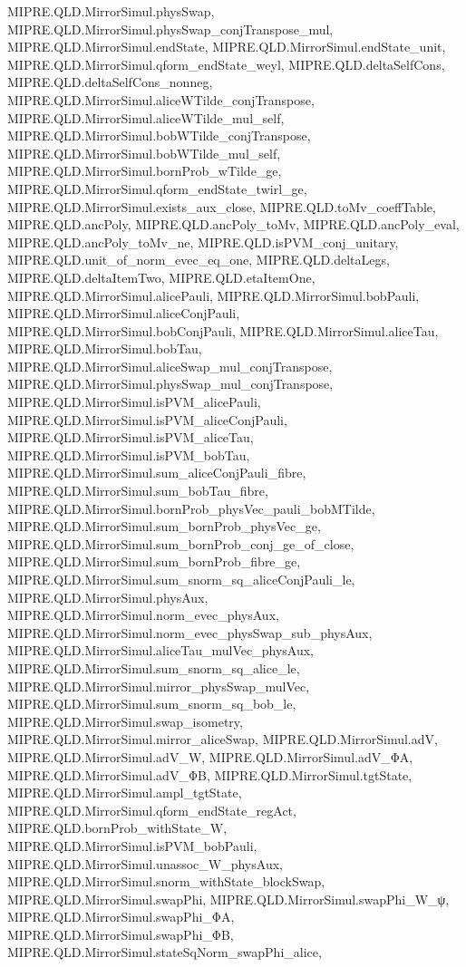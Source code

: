 \begin{lemma}
{  MIPRE.QLD.MirrorSimul.physSwap, MIPRE.QLD.MirrorSimul.physSwap_conjTranspose_mul,
  MIPRE.QLD.MirrorSimul.endState, MIPRE.QLD.MirrorSimul.endState_unit,
  MIPRE.QLD.MirrorSimul.qform_endState_weyl, MIPRE.QLD.deltaSelfCons,
  MIPRE.QLD.deltaSelfCons_nonneg, MIPRE.QLD.MirrorSimul.aliceWTilde_conjTranspose,
  MIPRE.QLD.MirrorSimul.aliceWTilde_mul_self, MIPRE.QLD.MirrorSimul.bobWTilde_conjTranspose,
  MIPRE.QLD.MirrorSimul.bobWTilde_mul_self, MIPRE.QLD.MirrorSimul.bornProb_wTilde_ge,
  MIPRE.QLD.MirrorSimul.qform_endState_twirl_ge, MIPRE.QLD.MirrorSimul.exists_aux_close,
  MIPRE.QLD.toMv_coeffTable, MIPRE.QLD.ancPoly, MIPRE.QLD.ancPoly_toMv, MIPRE.QLD.ancPoly_eval,
  MIPRE.QLD.ancPoly_toMv_ne, MIPRE.QLD.isPVM_conj_unitary, MIPRE.QLD.unit_of_norm_evec_eq_one,
  MIPRE.QLD.deltaLegs, MIPRE.QLD.deltaItemTwo, MIPRE.QLD.etaItemOne,
  MIPRE.QLD.MirrorSimul.alicePauli, MIPRE.QLD.MirrorSimul.bobPauli,
  MIPRE.QLD.MirrorSimul.aliceConjPauli, MIPRE.QLD.MirrorSimul.bobConjPauli,
  MIPRE.QLD.MirrorSimul.aliceTau, MIPRE.QLD.MirrorSimul.bobTau,
  MIPRE.QLD.MirrorSimul.aliceSwap_mul_conjTranspose,
  MIPRE.QLD.MirrorSimul.physSwap_mul_conjTranspose, MIPRE.QLD.MirrorSimul.isPVM_alicePauli,
  MIPRE.QLD.MirrorSimul.isPVM_aliceConjPauli, MIPRE.QLD.MirrorSimul.isPVM_aliceTau,
  MIPRE.QLD.MirrorSimul.isPVM_bobTau, MIPRE.QLD.MirrorSimul.sum_aliceConjPauli_fibre,
  MIPRE.QLD.MirrorSimul.sum_bobTau_fibre, MIPRE.QLD.MirrorSimul.bornProb_physVec_pauli_bobMTilde,
  MIPRE.QLD.MirrorSimul.sum_bornProb_physVec_ge,
  MIPRE.QLD.MirrorSimul.sum_bornProb_conj_ge_of_close, MIPRE.QLD.MirrorSimul.sum_bornProb_fibre_ge,
  MIPRE.QLD.MirrorSimul.sum_snorm_sq_aliceConjPauli_le, MIPRE.QLD.MirrorSimul.physAux,
  MIPRE.QLD.MirrorSimul.norm_evec_physAux, MIPRE.QLD.MirrorSimul.norm_evec_physSwap_sub_physAux,
  MIPRE.QLD.MirrorSimul.aliceTau_mulVec_physAux, MIPRE.QLD.MirrorSimul.sum_snorm_sq_alice_le,
  MIPRE.QLD.MirrorSimul.mirror_physSwap_mulVec, MIPRE.QLD.MirrorSimul.sum_snorm_sq_bob_le,
  MIPRE.QLD.MirrorSimul.swap_isometry, MIPRE.QLD.MirrorSimul.mirror_aliceSwap,
  MIPRE.QLD.MirrorSimul.adV, MIPRE.QLD.MirrorSimul.adV_W, MIPRE.QLD.MirrorSimul.adV_ΦA,
  MIPRE.QLD.MirrorSimul.adV_ΦB, MIPRE.QLD.MirrorSimul.tgtState, MIPRE.QLD.MirrorSimul.ampl_tgtState,
  MIPRE.QLD.MirrorSimul.qform_endState_regAct, MIPRE.QLD.bornProb_withState_W,
  MIPRE.QLD.MirrorSimul.isPVM_bobPauli, MIPRE.QLD.MirrorSimul.unassoc_W_physAux,
  MIPRE.QLD.MirrorSimul.snorm_withState_blockSwap, MIPRE.QLD.MirrorSimul.swapPhi,
  MIPRE.QLD.MirrorSimul.swapPhi_W_ψ, MIPRE.QLD.MirrorSimul.swapPhi_ΦA,
  MIPRE.QLD.MirrorSimul.swapPhi_ΦB, MIPRE.QLD.MirrorSimul.stateSqNorm_swapPhi_alice,
}
\end{lemma}
